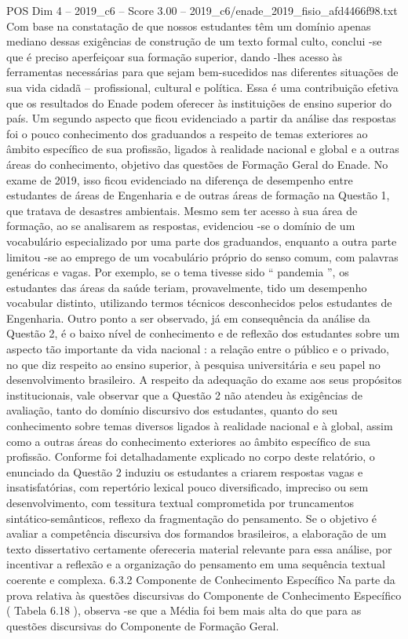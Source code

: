 \begin{textsample}{POS Dim 4 – 2019\_c6 – Score 3.00 – 2019\_c6/enade\_2019\_fisio\_afd4466f98.txt}
Com base na constatação de que nossos estudantes têm um domínio apenas mediano dessas exigências de construção de um texto formal culto, conclui -se que é preciso aperfeiçoar sua formação superior, dando -lhes acesso às ferramentas necessárias para que sejam bem-sucedidos nas diferentes situações de sua vida cidadã – profissional, cultural e política.
Essa é uma contribuição efetiva que os resultados do Enade podem oferecer às instituições de ensino superior do país.
Um segundo aspecto que ficou evidenciado a partir da análise das respostas foi o pouco conhecimento dos graduandos a respeito de temas exteriores ao âmbito específico de sua profissão, ligados à realidade nacional e global e a outras áreas do conhecimento, objetivo das questões de Formação Geral do Enade.
No exame de 2019, isso ficou evidenciado na diferença de desempenho entre estudantes de áreas de Engenharia e de outras áreas de formação na Questão 1, que tratava de desastres ambientais.
Mesmo sem ter acesso à sua área de formação, ao se analisarem as respostas, evidenciou -se o domínio de um vocabulário especializado por uma parte dos graduandos, enquanto a outra parte limitou -se ao emprego de um vocabulário próprio do senso comum, com palavras genéricas e vagas.
Por exemplo, se o tema tivesse sido “ pandemia ”, os estudantes das áreas da saúde teriam, provavelmente, tido um desempenho vocabular distinto, utilizando termos técnicos desconhecidos pelos estudantes de Engenharia.
Outro ponto a ser observado, já em consequência da análise da Questão 2, é o baixo nível de conhecimento e de reflexão dos estudantes sobre um aspecto tão importante da vida nacional : a relação entre o público e o privado, no que diz respeito ao ensino superior, à pesquisa universitária e seu papel no desenvolvimento brasileiro.
A respeito da adequação do exame aos seus propósitos institucionais, vale observar que a Questão 2 não atendeu às exigências de avaliação, tanto do domínio discursivo dos estudantes, quanto do seu conhecimento sobre temas diversos ligados à realidade nacional e à global, assim como a outras áreas do conhecimento exteriores ao âmbito específico de sua profissão.
Conforme foi detalhadamente explicado no corpo deste relatório, o enunciado da Questão 2 induziu os estudantes a criarem respostas vagas e insatisfatórias, com repertório lexical pouco diversificado, impreciso ou sem desenvolvimento, com tessitura textual comprometida por truncamentos sintático-semânticos, reflexo da fragmentação do pensamento.
Se o objetivo é avaliar a competência discursiva dos formandos brasileiros, a elaboração de um texto dissertativo certamente ofereceria material relevante para essa análise, por incentivar a reflexão e a organização do pensamento em uma sequência textual coerente e complexa. 6.3.2 Componente de Conhecimento Específico Na parte da prova relativa às questões discursivas do Componente de Conhecimento Específico ( Tabela 6.18 ), observa -se que a Média foi bem mais alta do que para as questões discursivas do Componente de Formação Geral.

\end{textsample}
